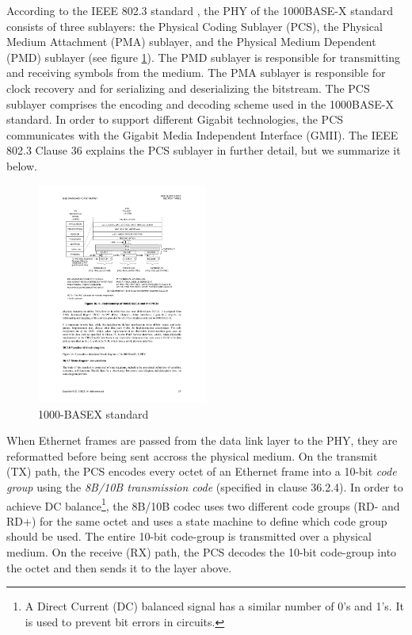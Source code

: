 \documentclass[conference]{IEEEtran}
\begin{document}
According to the IEEE 802.3 standard \cite{ieeestandard}, the PHY of the 1000BASE-X standard consists of three sublayers: the Physical Coding Sublayer (PCS), the Physical Medium Attachment (PMA) sublayer, and the Physical Medium Dependent (PMD) sublayer (see figure \ref{fig:archi}). The PMD sublayer is responsible for transmitting and receiving symbols from the medium. The PMA sublayer is responsible for clock recovery and for serializing and deserializing the bitstream. The PCS sublayer comprises the encoding and decoding scheme used in the 1000BASE-X standard. In order to support different Gigabit technologies, the PCS communicates with the Gigabit Media Independent Interface (GMII). The IEEE 802.3 Clause 36 explains the PCS sublayer in further detail, but we summarize it below.

\begin{figure}[t]
  \centering
  \includegraphics[width=0.5\textwidth]{images/archi.pdf}
  \caption{1000-BASEX standard}
  \label{fig:archi}
\end{figure}

When Ethernet frames are passed from the data link layer to the PHY, they are reformatted before being sent accross the physical medium. On the transmit (TX) path, the PCS encodes every octet of an Ethernet frame into a 10-bit \emph{code group} using the \emph{8B/10B transmission code} (specified in clause 36.2.4). In order to achieve DC balance\footnote{A Direct Current (DC) balanced signal has a similar number of 0's and 1's. It is used to prevent bit errors in circuits.}, the 8B/10B codec uses two different code groups (RD- and RD+) for the same octet and uses a state machine to define which code group should be used. The entire 10-bit code-group is transmitted over a physical medium. On the receive (RX) path, the PCS decodes the 10-bit code-group into the octet and then sends it to the layer above.
\end{document}
